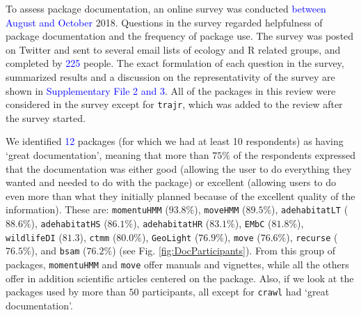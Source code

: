 \documentclass[a4paper,12pt]{article}
\newcommand{\Rpkg}[1]{\texttt{#1}}
\begin{document}
To assess package documentation, an online survey was conducted \textcolor{blue}{between August and October} 2018. Questions in the survey regarded helpfulness of package documentation and the frequency of package use. 
The survey was posted on Twitter and sent to several email lists of ecology and R related groups, and completed by \textcolor{blue}{225} people. The exact formulation of each question in the survey, summarized results and a discussion on the representativity of the survey are shown in \textcolor{blue}{Supplementary File 2 and 3}. %
All of the packages in this review were considered in the survey except for \Rpkg{trajr}, which was added to the review after the survey started. 


We identified \textcolor{blue}{12} packages (for which we had at least 10 respondents) as having `great documentation', meaning that more than $75\%$ of the respondents expressed that the documentation was either good (allowing the user to do everything they wanted and needed to do with the package) or excellent (allowing users to do even more than what they initially planned because of the excellent quality of the information). These are: \Rpkg{momentuHMM} ($93.8\%$), \Rpkg{moveHMM} ($89.5\%$), \Rpkg{adehabitatLT} ($88.6\%$), \Rpkg{adehabitatHS} ($86.1\%$), \Rpkg{adehabitatHR} ($83.1\%$), \Rpkg{EMbC} ($81.8\%$), \Rpkg{wildlifeDI} ($81.3$), \Rpkg{ctmm} ($80.0\%$), \Rpkg{GeoLight} ($76.9\%$), \Rpkg{move} ($76.6\%$), \Rpkg{recurse} ($76.5\%$), and \Rpkg{bsam} ($76.2\%$) (see Fig. \ref{fig:DocParticipants}). From this group of packages, \Rpkg{momentuHMM} and \Rpkg{move} offer manuals and vignettes, while all the others offer in addition scientific articles centered on the package. Also, if we look at the packages used by more than $50$ participants, all except for \Rpkg{crawl} had `great documentation'. %
\end{document}
